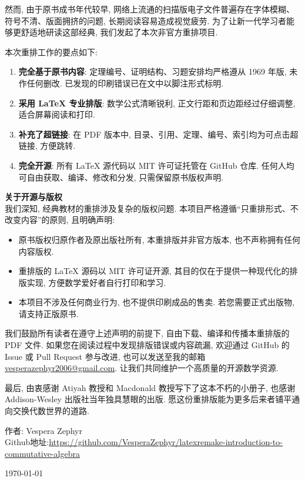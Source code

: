 \documentclass[11pt,b5paper,openright,twoside]{book}
\theoremstyle{plain}
\theoremstyle{definition}
\theoremstyle{remark}
\begin{document}
然而, 由于原书成书年代较早, 网络上流通的扫描版电子文件普遍存在字体模糊、符号不清、版面拥挤的问题, 长期阅读容易造成视觉疲劳. 为了让新一代学习者能够更舒适地研读这部经典, 我们发起了本次非官方重排项目. 

本次重排工作的要点如下: 
\begin{enumerate}
  \item \textbf{完全基于原书内容}: 定理编号、证明结构、习题安排均严格遵从 1969 年版, 未作任何删改. 已发现的印刷错误已在文中以脚注形式标明. 
  \item \textbf{采用 \LaTeX{} 专业排版}: 数学公式清晰锐利, 正文行距和页边距经过仔细调整, 适合屏幕阅读和打印. 
  \item \textbf{补充了超链接}: 在 PDF 版本中, 目录、引用、定理、编号、索引均为可点击超链接, 方便跳转. 
  \item \textbf{完全开源}: 所有 \LaTeX{} 源代码以 MIT 许可证托管在 GitHub 仓库. 任何人均可自由获取、编译、修改和分发, 只需保留原书版权声明. 
\end{enumerate}

\noindent\textbf{关于开源与版权}\\
我们深知, 经典教材的重排涉及复杂的版权问题. 本项目严格遵循“只重排形式、不改变内容”的原则, 且明确声明: 
\begin{itemize}
  \item 原书版权归原作者及原出版社所有, 本重排版并非官方版本, 也不声称拥有任何内容版权. 
  \item 重排版的 \LaTeX{} 源码以 MIT 许可证开源, 其目的仅在于提供一种现代化的排版实现, 方便数学爱好者自行打印和学习. 
  \item 本项目不涉及任何商业行为, 也不提供印刷成品的售卖. 若您需要正式出版物, 请支持正版原书. 
\end{itemize}

我们鼓励所有读者在遵守上述声明的前提下, 自由下载、编译和传播本重排版的 PDF 文件. 如果您在阅读过程中发现排版错误或内容疏漏, 欢迎通过 GitHub 的 Issue 或 Pull Request 参与改进, 也可以发送至我的邮箱 \href{vesperazephyr2006@gmail.com}{vesperazephyr2006@gmail.com}. 让我们共同维护一个高质量的开源数学资源. 

最后, 由衷感谢 Atiyah 教授和 Macdonald 教授写下了这本不朽的小册子, 也感谢 Addison-Wesley 出版社当年独具慧眼的出版. 愿这份重排版能为更多后来者铺平通向交换代数世界的道路. 

\vspace{1.5cm}
\begin{flushright}
  作者: Vespera Zephyr\\
  Github地址:\url{https://github.com/VesperaZephyr/latexremake-introduction-to-commutative-algebra}

  \today
\end{flushright}
\tableofcontents

\mainmatter
\pagestyle{fancy}













\backmatter
\printindex
{}
\end{document}
